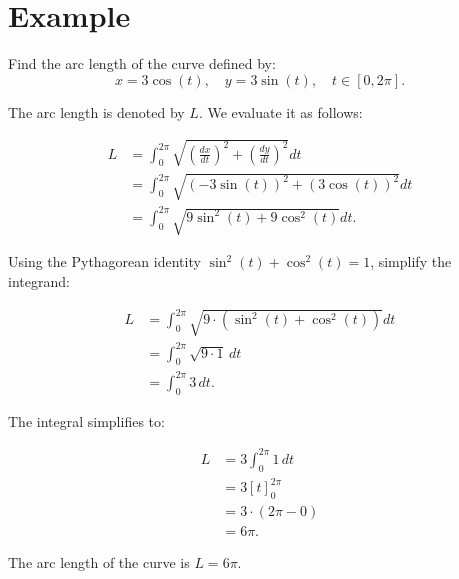 \documentclass{article}
\begin{document}
\section*{Example}
\begin{examplebox}
    Find the arc length of the curve defined by:
    \[
        x = 3\cos(t), \quad y = 3\sin(t), \quad t \in [0, 2\pi].
    \]
    
    \begin{solutionbox}
        The arc length is denoted by \( L \). We evaluate it as follows:

        \begin{equation*}
            \begin{aligned}
                L &= \int_{0}^{2\pi} \sqrt{\left(\frac{dx}{dt}\right)^2 + \left(\frac{dy}{dt}\right)^2} dt \\
                &= \int_{0}^{2\pi} \sqrt{\left(-3\sin(t)\right)^2 + \left(3\cos(t)\right)^2} dt \\
                &= \int_{0}^{2\pi} \sqrt{9\sin^2(t) + 9\cos^2(t)} dt.
            \end{aligned}
        \end{equation*}
    
        Using the Pythagorean identity \( \sin^2(t) + \cos^2(t) = 1 \), simplify the integrand:
    
        \begin{equation*}
            \begin{aligned}
                L &= \int_{0}^{2\pi} \sqrt{9 \cdot (\sin^2(t) + \cos^2(t))} dt \\
                &= \int_{0}^{2\pi} \sqrt{9 \cdot 1} \, dt \\
                &= \int_{0}^{2\pi} 3 \, dt.
            \end{aligned}
        \end{equation*}
    
        The integral simplifies to:
    
        \begin{equation*}
            \begin{aligned}
                L &= 3 \int_{0}^{2\pi} 1 \, dt \\
                &= 3 \left[t\right]_{0}^{2\pi} \\
                &= 3 \cdot \left(2\pi - 0\right) \\
                &= 6\pi.
            \end{aligned}
        \end{equation*}
        \begin{answerbox}
            The arc length of the curve is \( L = 6\pi \).
        \end{answerbox}
    \end{solutionbox}
\end{examplebox}
\end{document}
